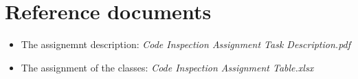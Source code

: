 \section{Reference documents}
\begin{itemize}
	\item The assignemnt description: \textit{Code Inspection Assignment Task Description.pdf}
	\item The assignment of the classes: \textit{Code Inspection Assignment Table.xlsx}
\end{itemize}